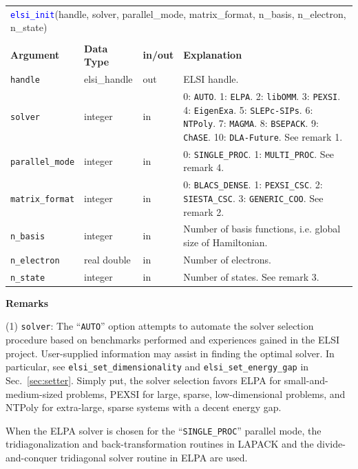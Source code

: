 \documentclass{report}
\newcommand{\api}[1]{\textcolor{blue}{\texttt{#1}}}
\begin{document}
\begin{tabular}[]{|p{25mm}|p{20mm}|p{10mm}|p{107mm}|}
\multicolumn{4}{l}{\api{elsi\_init}(handle, solver, parallel\_mode, matrix\_format, n\_basis, n\_electron, n\_state)}\\
\multicolumn{4}{l}{}\\
\hline
\multicolumn{1}{|l|}{\textbf{Argument}} & \multicolumn{1}{l|}{\textbf{Data Type}} & \multicolumn{1}{l|}{\textbf{in/out}} & \multicolumn{1}{l|}{\textbf{Explanation}}\\
\hline
\texttt{handle}         & elsi\_handle & out & ELSI handle.\\
\hline
  \texttt{solver}         & integer      & in  & 0: \texttt{AUTO}. 1: \texttt{ELPA}. 2: \texttt{libOMM}. 3: \texttt{PEXSI}. 4: \texttt{EigenExa}. 5: \texttt{SLEPc-SIPs}. 6: \texttt{NTPoly}. 7: \texttt{MAGMA}. 8: \texttt{BSEPACK}. 9: \texttt{ChASE}. 10: \texttt{DLA-Future}. See remark 1.\\
\hline
\texttt{parallel\_mode} & integer      & in  & 0: \texttt{SINGLE\_PROC}. 1: \texttt{MULTI\_PROC}. See remark 4.\\
\hline
\texttt{matrix\_format} & integer      & in  & 0: \texttt{BLACS\_DENSE}. 1: \texttt{PEXSI\_CSC}. 2: \texttt{SIESTA\_CSC}. 3: \texttt{GENERIC\_COO}. See remark 2.\\
\hline
\texttt{n\_basis}       & integer      & in  & Number of basis functions, i.e. global size of Hamiltonian.\\
\hline
\texttt{n\_electron}    & real double  & in  & Number of electrons.\\
\hline
\texttt{n\_state}       & integer      & in  & Number of states. See remark 3.\\
\hline
\end{tabular}

\textbf{Remarks}

(1) \texttt{solver}: The ``\texttt{AUTO}'' option attempts to automate the solver selection procedure based on benchmarks performed and experiences gained in the ELSI project. User-supplied information may assist in finding the optimal solver. In particular, see \texttt{elsi\_set\_dimensionality} and \texttt{elsi\_set\_energy\_gap} in Sec.~\ref{sec:setter}. Simply put, the solver selection favors ELPA for small-and-medium-sized problems, PEXSI for large, sparse, low-dimensional problems, and NTPoly for extra-large, sparse systems with a decent energy gap.

When the ELPA solver is chosen for the ``\texttt{SINGLE\_PROC}'' parallel mode, the tridiagonalization and back-transformation routines in LAPACK and the divide-and-conquer tridiagonal solver routine in ELPA are used.
\end{document}
